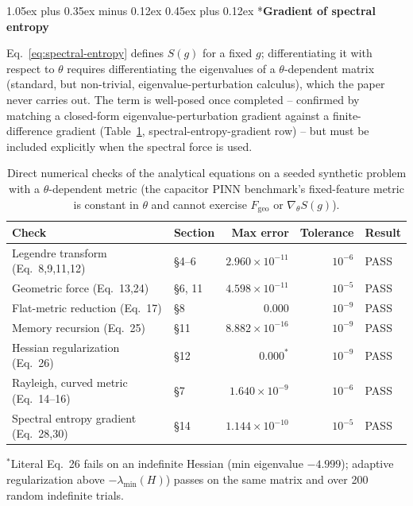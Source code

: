 \documentclass[10pt,twocolumn]{article}
\makeatletter
\newcommand{\finding}[1]{\textbf{#1}}
\renewcommand\subsection{\@startsection{subsection}{2}{0pt}%
  {1.05ex plus 0.35ex minus 0.12ex}%
  {0.45ex plus 0.12ex}%
  {\normalsize\bfseries}}
\makeatother
\begin{document}
\subsection*{\finding{Gradient of spectral entropy}}

Eq.~\eqref{eq:spectral-entropy} defines $S(g)$ for a fixed $g$; differentiating
it with respect to $\theta$ requires differentiating the eigenvalues of a
$\theta$-dependent matrix (standard, but non-trivial, eigenvalue-perturbation
calculus), which the paper never carries out. The term is well-posed once
completed -- confirmed by matching a closed-form eigenvalue-perturbation
gradient against a finite-difference gradient
(Table~\ref{tab:numeric-checks}, spectral-entropy-gradient row) -- but
must be included explicitly when the spectral force is used.

\begin{table}[t]
\centering
\caption{Direct numerical checks of the analytical equations on a seeded synthetic
problem with a $\theta$-dependent metric (the
capacitor PINN benchmark's fixed-feature metric is constant in $\theta$ and
cannot exercise $F_{\mathrm{geo}}$ or $\nabla_\theta S(g)$).}
\label{tab:numeric-checks}
\begin{tabular}{@{}llrrl@{}}
\toprule
Check & Section & Max error & Tolerance & Result \\
\midrule
Legendre transform (Eq.~8,9,11,12) & \S4--6 & $2.960\times10^{-11}$ & $10^{-6}$ & PASS \\
Geometric force (Eq.~13,24) & \S6, 11 & $4.598\times10^{-11}$ & $10^{-5}$ & PASS \\
Flat-metric reduction (Eq.~17) & \S8 & $0.000$ & $10^{-9}$ & PASS \\
Memory recursion (Eq.~25) & \S11 & $8.882\times10^{-16}$ & $10^{-9}$ & PASS \\
Hessian regularization (Eq.~26) & \S12 & $0.000^{\ast}$ & $10^{-9}$ & PASS \\
Rayleigh, curved metric (Eq.~14--16) & \S7 & $1.640\times10^{-9}$ & $10^{-6}$ & PASS \\
Spectral entropy gradient (Eq.~28,30) & \S14 & $1.144\times10^{-10}$ & $10^{-5}$ & PASS \\
\bottomrule
\end{tabular}

\vspace{2pt}
{\footnotesize $^\ast$Literal Eq.~26 fails on an indefinite Hessian
(min eigenvalue $-4.999$); adaptive regularization above
$-\lambda_{\min}(H)$) passes on the same matrix and over 200 random indefinite
trials.}
\end{table}
\end{document}
